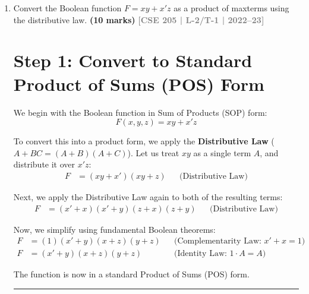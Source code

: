 \documentclass[12pt,a3paper]{article}
\newcommand{\yr}[1]{\hfill\textcolor{gray}{\small\textbf{[#1]}}}
\newcommand{\mk}[1]{\textcolor{orange!70!black}{\small\textbf{(#1 marks)}}}
\begin{document}
\begin{enumerate}
\begin{tcolorbox}[enhanced,breakable,ansbox,colback=cB!4,colframe=cB,boxrule=0.8pt,arc=5pt,title={\textbf{Answer}},fonttitle=\bfseries\color{white},colbacktitle=cB]
By summing these minterms, we arrive at the final canonical expression:
\begin{equation}
    \textcolor{cB}{\mathbf{F(x, y, z) = \sum m(1, 3, 6, 7)}}
\end{equation}

\end{tcolorbox}

\item Convert the Boolean function $F = xy + x'z$ as a product of maxterms using the distributive law.
\mk{10} \yr{CSE 205 | L-2/T-1 | 2022--23}

\begin{tcolorbox}[enhanced,breakable,ansbox,colback=cB!4,colframe=cB,boxrule=0.8pt,arc=5pt,title={\textbf{Answer}},fonttitle=\bfseries\color{white},colbacktitle=cB]

\section*{Step 1: Convert to Standard Product of Sums (POS) Form}

We begin with the Boolean function in Sum of Products (SOP) form:
\begin{equation*}
    F(x, y, z) = xy + x'z
\end{equation*}

To convert this into a product form, we apply the \textbf{Distributive Law} ($A + BC = (A+B)(A+C)$). Let us treat $xy$ as a single term $A$, and distribute it over $x'z$:
\begin{align*}
    F &= (xy + x')(xy + z) && \text{(Distributive Law)}
\end{align*}

Next, we apply the Distributive Law again to both of the resulting terms:
\begin{align*}
    F &= (x' + x)(x' + y)(z + x)(z + y) && \text{(Distributive Law)}
\end{align*}

Now, we simplify using fundamental Boolean theorems:
\begin{align*}
    F &= (1)(x' + y)(x + z)(y + z) && \text{(Complementarity Law: } x' + x = 1 \text{)} \\
    F &= (x' + y)(x + z)(y + z) && \text{(Identity Law: } 1 \cdot A = A \text{)}
\end{align*}

The function is now in a standard Product of Sums (POS) form.

\vspace{0.2cm}
\hrule
\vspace{0.4cm}


\end{tcolorbox}
\end{enumerate}
\end{document}
